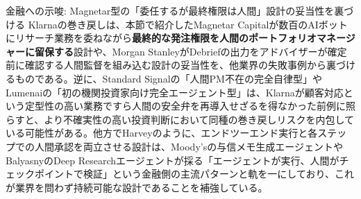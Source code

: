 \begin{insight}{金融への示唆: Magnetar型の「委任するが最終権限は人間」設計の妥当性を裏づける}
Klarnaの巻き戻しは、本節で紹介したMagnetar Capitalが数百のAIボットにリサーチ業務を委ねながら\textbf{最終的な発注権限を人間のポートフォリオマネージャーに留保する}設計\cite{magnetar2026}や、Morgan StanleyがDebriefの出力をアドバイザーが確定前に確認する人間監督を組み込む設計\cite{x03morganstanley_openai2026}の妥当性を、他業界の失敗事例から裏づけるものである。逆に、Standard Signalの「人間PM不在の完全自律型」\cite{ycombinator2026standardsignal}やLumenaiの「初の機関投資家向け完全エージェント型」\cite{lumenai2026}は、Klarnaが顧客対応という定型性の高い業務ですら人間の安全弁を再導入せざるを得なかった前例に照らすと、より不確実性の高い投資判断において同種の巻き戻しリスクを内包している可能性がある。他方でHarveyのように、エンドツーエンド実行と各ステップでの人間承認を両立させる設計は、Moody'sの与信メモ生成エージェント\cite{moodys2026creditmemo}やBalyasnyのDeep Researchエージェント\cite{x03balyasny_openai2026}が採る「エージェントが実行、人間がチェックポイントで検証」という金融側の主流パターンと軌を一にしており、これが業界を問わず持続可能な設計であることを補強している。
\end{insight}

\begin{center}
\end{center}

